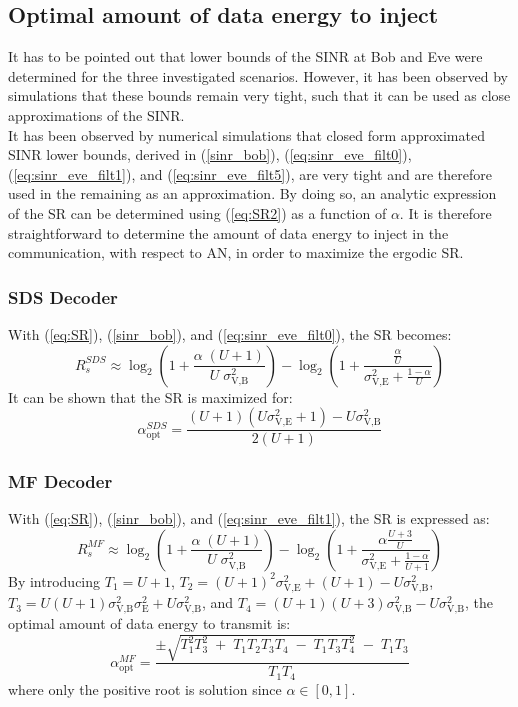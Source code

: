 \documentclass[journal,comsoc]{IEEEtran}
\begin{document}
\subsection{Optimal amount of data energy to inject}
\label{subsec:best_alpha}
It has to be pointed out that lower bounds of the SINR at Bob and Eve were determined for the three investigated scenarios. However, it has been observed by simulations that these bounds remain very tight, such that it can be used as close approximations of the SINR.\\
It has been observed by numerical simulations that closed form approximated SINR lower bounds, derived in (\ref{sinr_bob}),  (\ref{eq:sinr_eve_filt0}), (\ref{eq:sinr_eve_filt1}), and (\ref{eq:sinr_eve_filt5}), are very tight and are therefore used in the remaining as an approximation. By doing so, an analytic expression of the SR can be determined using (\ref{eq:SR2}) as a function of $\alpha$. It is therefore straightforward to determine the amount of data energy to inject in the communication, with respect to AN, in order to maximize the ergodic SR.
\subsubsection{SDS Decoder}
 With (\ref{eq:SR}), (\ref{sinr_bob}), and (\ref{eq:sinr_eve_filt0}), the SR becomes:
\begin{equation}
R_s^{SDS} \approx \log_2 \left( 1 +  \frac{\alpha \;(U+1)}{U \; \sigma_{\text{V,B}}^2} \right) - \log_2\left( 1 + \frac{\frac{\alpha}{U}}{\sigma^2_{\text{V,E}}+\frac{1-\alpha}{U}}\right)
\label{eq:SR_anal2_decod_0}
\end{equation}
It can be shown that the SR is maximized for:
\begin{equation}
\alpha_{\text{opt}}^{SDS} = \frac{(U+1)(U\sigma_{\text{V,E}}^2 + 1)- U\sigma_{\text{V,B}}^2}{2(U+1)}
\label{eq:optimal_alpha_decod_0}
\end{equation}


\subsubsection{MF Decoder}
With (\ref{eq:SR}), (\ref{sinr_bob}), and (\ref{eq:sinr_eve_filt1}), the SR is expressed as:
\begin{equation}
R_s^{MF} \approx \log_2 \left( 1 +  \frac{\alpha \;(U+1)}{U \; \sigma_{\text{V,B}}^2} \right) - \log_2\left( 1 +  \frac{\alpha \frac{U+3}{U}}{\sigma^2_{\text{V,E}} + \frac{1-\alpha}{U+1}}\right)
\label{eq:SR_anal2_decod_1}
\end{equation}
By introducing $T_1 = U+1$, $T_2 = (U+1)^2\sigma_{\text{V,E}}^2 + (U+1) - U\sigma_{\text{V,B}}^2$, $T_3 = U(U+1)\sigma_{\text{V,B}}^2\sigma_{\text{E}}^2 + U \sigma_{\text{V,B}}^2$, and $T_4=(U+1)(U+3)\sigma_{\text{V,B}}^2-U\sigma_{\text{V,B}}^2$, the optimal amount of data energy to transmit is: 
\begin{equation}
\alpha_{\text{opt}}^{MF} = \frac{\pm\sqrt{T_1^2 T_3^2 \; + \; T_1 T_2 T_3 T_4 \; - \; T_1 T_3 T_4^2} \; - \; T_1 T_3}{T_1 T_4}
\label{eq:optimal_alpha_decod_1}
\end{equation}
where only the positive root is solution since $\alpha \in [0,1]$.
\end{document}
